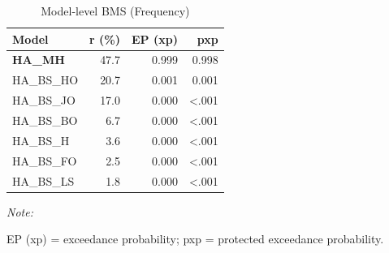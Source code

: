 \begin{table}[!h]
\centering
\caption{Model-level BMS (Frequency)}
\centering
\begin{threeparttable}
\begin{tabular}[t]{lrrr}
\toprule
Model & r (\%) & EP (xp) & pxp\\
\midrule
\textbf{HA_MH} & 47.7 & 0.999 & 0.998\\
HA_BS_HO & 20.7 & 0.001 & 0.001\\
HA_BS_JO & 17.0 & 0.000 & <.001\\
HA_BS_BO & 6.7 & 0.000 & <.001\\
HA_BS_H & 3.6 & 0.000 & <.001\\
HA_BS_FO & 2.5 & 0.000 & <.001\\
HA_BS_LS & 1.8 & 0.000 & <.001\\
\bottomrule
\end{tabular}
\begin{tablenotes}
\item \textit{Note: } 
\item EP (xp) = exceedance probability; pxp = protected exceedance probability.
\end{tablenotes}
\end{threeparttable}
\end{table}
